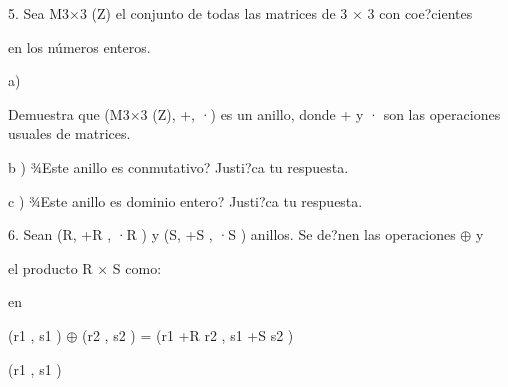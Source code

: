 \documentclass[a4paper,portrait,12pt]{article}
\begin{document}
\begin{flushleft}
5. Sea M3×3 (Z) el conjunto de todas las matrices de 3 × 3 con coe?cientes
\end{flushleft}


\begin{flushleft}
en los n\'{u}meros enteros.
\end{flushleft}


\begin{flushleft}
a)
\end{flushleft}





\begin{flushleft}
Demuestra que (M3×3 (Z), +, ·) es un anillo, donde + y · son las operaciones usuales de matrices.
\end{flushleft}


\begin{flushleft}
b ) ¾Este anillo es conmutativo? Justi?ca tu respuesta.
\end{flushleft}


\begin{flushleft}
c ) ¾Este anillo es dominio entero? Justi?ca tu respuesta.
\end{flushleft}





\begin{flushleft}
6. Sean (R, +R , ·R ) y (S, +S , ·S ) anillos. Se de?nen las operaciones $\oplus$ y
\end{flushleft}


\begin{flushleft}
el producto R × S como:
\end{flushleft}





\begin{flushleft}
en
\end{flushleft}





\begin{flushleft}
(r1 , s1 ) $\oplus$ (r2 , s2 ) = (r1 +R r2 , s1 +S s2 )
\end{flushleft}


\begin{flushleft}
(r1 , s1 )
\end{flushleft}
\end{document}
